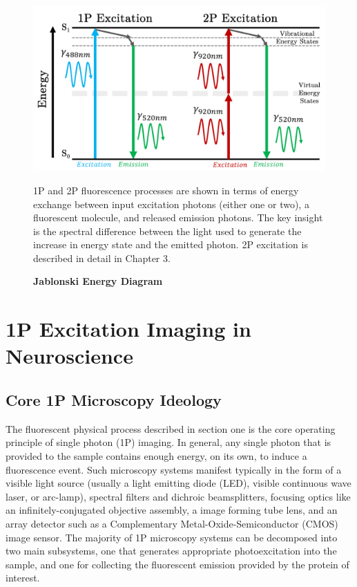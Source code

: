 \documentclass [PhD] {UCLAthesis}
\begin{document}
\begin{figure}
\centering
\includegraphics[width=0.9\linewidth]{Figures/Fluorescence.PNG}
\caption{\textbf{Jablonski Energy Diagram}}
\raggedright
1P and 2P fluorescence processes are shown in terms of energy exchange between input excitation photons (either one or two), a fluorescent molecule, and released emission photons. The key insight is the spectral difference between the light used to generate the increase in energy state and the emitted photon. 2P excitation is described in detail in Chapter 3.
\label{fig:fluorescence}
\end{figure}



\chapter{1P Excitation Imaging in Neuroscience}
\section{Core 1P Microscopy Ideology}
The fluorescent physical process described in section one is the core operating principle of single photon (1P) imaging. In general, any single photon that is provided to the sample contains enough energy, on its own, to induce a fluorescence event. Such microscopy systems manifest typically in the form of a visible light source (usually a light emitting diode (LED), visible continuous wave laser, or arc-lamp), spectral filters and dichroic beamsplitters, focusing optics like an infinitely-conjugated objective assembly, a image forming tube lens, and an array detector such as a Complementary Metal-Oxide-Semiconductor (CMOS) image sensor. The majority of 1P microscopy systems can be decomposed into two main subsystems, one that generates appropriate photoexcitation into the sample, and one for collecting the fluorescent emission provided by the protein of interest. 
\end{document}
